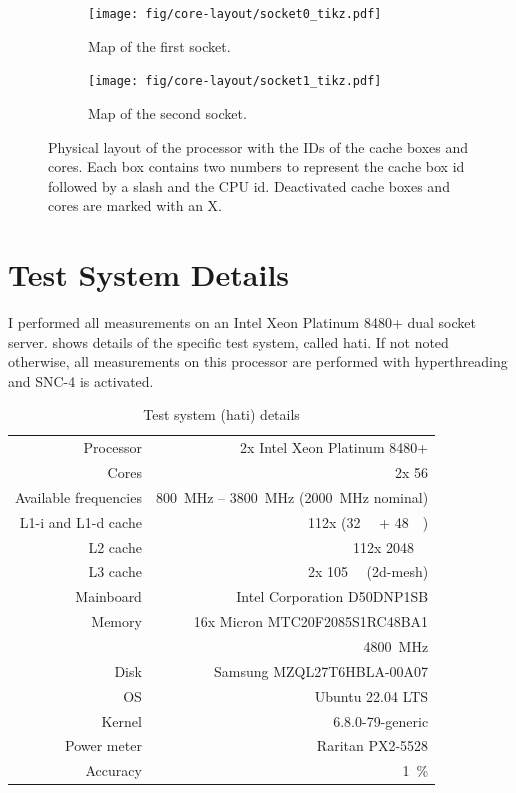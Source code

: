 \begin{figure}[]
    \begin{subfigure}[t]{0.45\linewidth}
        \centering
        \texttt{[image: fig/core-layout/socket0\_tikz.pdf]}
        \caption{Map of the first socket.}
    \end{subfigure}
    \hfill
    \begin{subfigure}[t]{0.45\linewidth}
        \centering
        \texttt{[image: fig/core-layout/socket1\_tikz.pdf]}
        \caption{Map of the second socket.}
    \end{subfigure}
    \caption{\label{fig:physical-layout}Physical layout of the processor with the IDs of the cache boxes and cores.
	Each box contains two numbers to represent the cache box id followed by a slash and the CPU id.
	Deactivated cache boxes and cores are marked with an X.}
\end{figure}

\section{Test System Details}
I performed all measurements on an Intel Xeon Platinum 8480+ dual socket server.
 shows details of the specific test system, called hati.
If not noted otherwise, all measurements on this processor are performed with hyperthreading and SNC-4 is activated.

\begin{table}[t]
	\centering
	\caption{\label{tab:test-system}Test system (hati) details}
	\begin{tabular}{rr}
		\toprule
		Processor	&	2x Intel Xeon Platinum 8480+ \\
		\rowcolor[HTML]{EFEFEF}Cores		&	2x 56 \\
		Available frequencies	&	\SI{800}{\MHz} -- \SI{3800}{\MHz} (\SI{2000}{\MHz} nominal) \\
		\rowcolor[HTML]{EFEFEF}L1-i and L1-d cache	&	112x (\SI{32}{\kibi\byte} + \SI{48}{\kibi\byte})\\
		L2 cache	&	112x \SI{2048}{\kibi\byte} \\
		\rowcolor[HTML]{EFEFEF}L3 cache	&	2x \SI{105}{\mebi\byte} (2d-mesh) \\
		Mainboard	&	Intel Corporation D50DNP1SB \\
		\rowcolor[HTML]{EFEFEF}Memory		&	16x Micron MTC20F2085S1RC48BA1  \\
		\rowcolor[HTML]{EFEFEF}&	\SI{4800}{\mega\hertz} \\
		Disk		&	Samsung MZQL27T6HBLA-00A07 \\
		\rowcolor[HTML]{EFEFEF}OS           &   Ubuntu 22.04 LTS \\
		Kernel          &   6.8.0-79-generic \\
		\rowcolor[HTML]{EFEFEF}Power meter & Raritan PX2-5528\\
		Accuracy & \SI{1}{\percent}\\
		\bottomrule
	\end{tabular}
\end{table}

